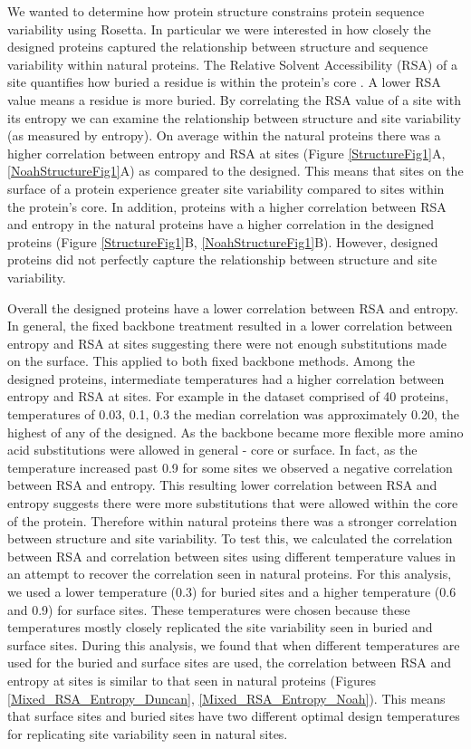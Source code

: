 \documentclass[12pt]{article}
\begin{document}
\par We wanted to determine how protein structure constrains protein sequence variability using Rosetta. In particular we were interested in how closely the designed proteins captured the relationship between structure and sequence variability within natural proteins. The Relative Solvent Accessibility (RSA) of a site quantifies how buried a residue is within the protein's core \cite{Franzosa2009}.  A lower RSA value means a residue is more buried. By correlating the RSA value of a site with its entropy we can examine the relationship between structure and site variability (as measured by entropy).  On average within the natural proteins there was a higher correlation between entropy and RSA at sites (Figure \ref{StructureFig1}A, \ref{NoahStructureFig1}A) as compared to the designed. This means that sites on the surface of a protein experience greater site variability compared to sites within the protein's core. In addition, proteins with a higher correlation between RSA and entropy in the natural proteins have a higher correlation in the designed proteins (Figure \ref{StructureFig1}B, \ref{NoahStructureFig1}B). However, designed proteins did not perfectly capture the relationship between structure and site variability. 

\par Overall the designed proteins have a lower correlation between RSA and entropy.  In general, the fixed backbone treatment resulted in a lower correlation between entropy and RSA at sites suggesting there were not enough substitutions made on the surface.  This applied to both fixed backbone methods. Among the designed proteins, intermediate temperatures had a higher correlation between entropy and RSA at sites. For example in the dataset comprised of 40 proteins, temperatures of 0.03, 0.1, 0.3 the median correlation was approximately 0.20, the highest of any of the designed. As the backbone became more flexible more amino acid substitutions were allowed in general - core or surface. In fact, as the temperature increased past 0.9 for some sites we observed a negative correlation between RSA and entropy.  This resulting lower correlation between RSA and entropy suggests there were more substitutions that were allowed within the core of the protein. Therefore within natural proteins there was a stronger correlation between structure and site variability.  To test this, we calculated the correlation between RSA and correlation between sites using different temperature values in an attempt to recover the correlation seen in natural proteins. For this analysis, we used a lower temperature (0.3) for buried sites and a higher temperature (0.6 and 0.9) for surface sites. These temperatures were chosen because these temperatures mostly closely replicated the site variability seen in buried and surface sites. During this analysis, we found that when different temperatures are used for the buried and surface sites are used, the correlation between RSA and entropy at sites is similar to that seen in natural proteins (Figures \ref{Mixed_RSA_Entropy_Duncan}, \ref{Mixed_RSA_Entropy_Noah}). This means that surface sites and buried sites have two different optimal design temperatures for replicating site variability seen in natural sites. 
\end{document}
